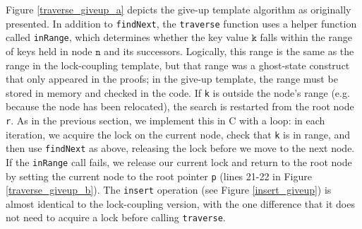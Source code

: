 \documentclass[a4paper,UKenglish,cleveref, autoref, thm-restate]{lipics-v2021}
\begin{document}
Figure \ref{traverse_giveup_a} depicts the give-up template algorithm as originally presented. In addition to \lstinline{findNext}, the \lstinline{traverse} function uses a helper function called \lstinline{inRange}, which determines whether the key value $\texttt{k}$ falls within the range of keys held in node $\texttt{n}$ and its successors. Logically, this range is the same as the range in the lock-coupling template, but that range was a ghost-state construct that only appeared in the proofs; in the give-up template, the range must be stored in memory and checked in the code. If \lstinline{k} is outside the node's range (e.g. because the node has been relocated), the search is restarted from the root node \lstinline{r}. As in the previous section, we implement this in C with a loop: in each iteration, we acquire the lock on the current node, check that \lstinline{k} is in range, and then use \lstinline{findNext} as above, releasing the lock before we move to the next node. If the \lstinline{inRange} call fails, we release our current lock and return to the root node by setting the current node to the root pointer \lstinline{p} (lines 21-22 in Figure \ref{traverse_giveup_b}). The \texttt{insert} operation (see Figure \ref{insert_giveup}) is almost identical to the lock-coupling version, with the one difference that it does not need to acquire a lock before calling \texttt{traverse}.
\end{document}
